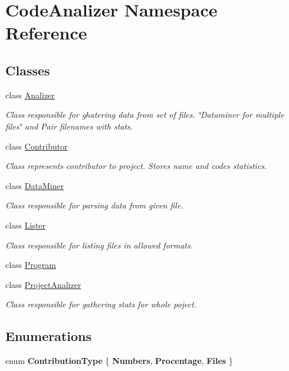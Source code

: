 \hypertarget{namespace_code_analizer}{}\section{Code\+Analizer Namespace Reference}
\label{namespace_code_analizer}
\subsection*{Classes}
\begin{DoxyCompactItemize}
\item 
class \mbox{\hyperlink{class_code_analizer_1_1_analizer}{Analizer}}
\begin{DoxyCompactList}\small\item\em Class responsible for ghatering data from set of files. \char`\"{}\+Dataminer for multiple files\char`\"{} and Pair filenames with stats. \end{DoxyCompactList}\item 
class \mbox{\hyperlink{class_code_analizer_1_1_contributor}{Contributor}}
\begin{DoxyCompactList}\small\item\em Class represents contributor to project. Stores name and codes statistics. \end{DoxyCompactList}\item 
class \mbox{\hyperlink{class_code_analizer_1_1_data_miner}{Data\+Miner}}
\begin{DoxyCompactList}\small\item\em Class responsible for parsing data from given file. \end{DoxyCompactList}\item 
class \mbox{\hyperlink{class_code_analizer_1_1_lister}{Lister}}
\begin{DoxyCompactList}\small\item\em Class responsible for listing files in allowed formats. \end{DoxyCompactList}\item 
class \mbox{\hyperlink{class_code_analizer_1_1_program}{Program}}
\item 
class \mbox{\hyperlink{class_code_analizer_1_1_project_analizer}{Project\+Analizer}}
\begin{DoxyCompactList}\small\item\em Class responsible for gathering stats for whole poject. \end{DoxyCompactList}\end{DoxyCompactItemize}
\subsection*{Enumerations}
\begin{DoxyCompactItemize}
\item 
\mbox{\label{namespace_code_analizer_a0be1d7edf4463e31c78bd9637e764014}} 
enum {\bfseries Contribution\+Type} \{ {\bfseries Numbers}, 
{\bfseries Procentage}, 
{\bfseries Files}
 \}
\end{DoxyCompactItemize}
